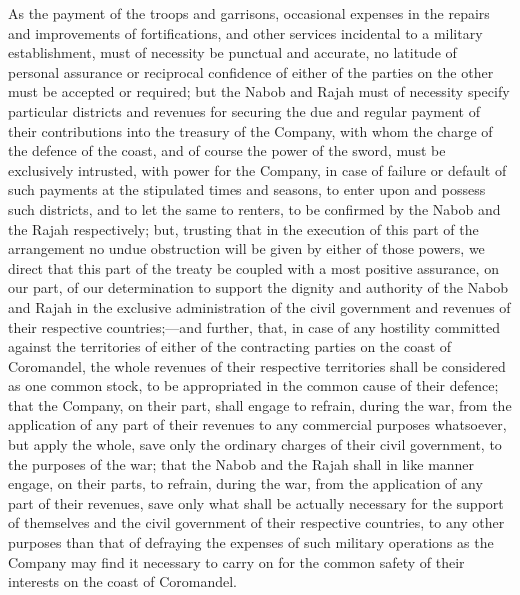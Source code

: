 As the payment of the troops and garrisons, occasional expenses in the repairs and improvements of fortifications, and other services incidental to a military establishment, must of necessity be punctual and accurate, no latitude of personal assurance or reciprocal confidence of either of the parties on the other must be accepted or required; but the Nabob and Rajah must of necessity specify particular districts and revenues for securing the due and regular payment of their contributions into the treasury of the Company, with whom the charge of the defence of the coast, and of course the power of the sword, must be exclusively intrusted, with power for the Company, in case of failure or default of such payments at the stipulated times and seasons, to enter upon and possess such districts, and to let the same to renters, to be confirmed by the Nabob and the Rajah respectively; but, trusting that in the execution of this part of the arrangement no undue obstruction will be given by either of those powers, we direct that this part of the treaty be coupled with a most positive assurance, on our part, of our determination to support the dignity and authority of the Nabob and Rajah in the exclusive administration of the civil government and revenues of their respective countries;—and further, that, in case of any hostility committed against the territories of either of the contracting parties on the coast of Coromandel, the whole revenues of their respective territories shall be considered as one common stock, to be appropriated in the common cause of their defence; that the Company, on their part, shall engage to refrain, during the war, from the application of any part of their revenues to any commercial purposes whatsoever, but apply the whole, save only the ordinary charges of their civil government, to the purposes of the war; that the Nabob and the Rajah shall in like manner engage, on their parts, to refrain, during the war, from the application of any part of their revenues, save only what shall be actually necessary for the support of themselves and the civil government of their respective countries, to any other purposes than that of defraying the expenses of such military operations as the Company may find it necessary to carry on for the common safety of their interests on the coast of Coromandel.

